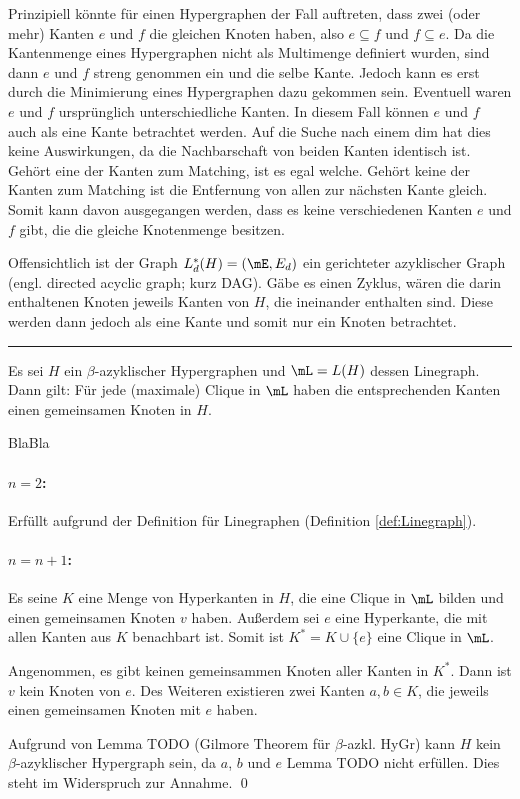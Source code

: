 Prinzipiell könnte für einen Hypergraphen der Fall auftreten, dass zwei (oder mehr) Kanten $e$ und $f$ die gleichen Knoten haben, also $e\subseteq f$ und $f\subseteq e$. Da die Kantenmenge eines Hypergraphen nicht als Multimenge definiert wurden, sind dann $e$ und $f$ streng genommen ein und die selbe Kante. Jedoch kann es erst durch die Minimierung eines Hypergraphen dazu gekommen sein. Eventuell waren $e$ und $f$ ursprünglich unterschiedliche Kanten. In diesem Fall können $e$ und $f$ auch als eine Kante betrachtet werden. Auf die Suche nach einem dim hat dies keine Auswirkungen, da die Nachbarschaft von beiden Kanten identisch ist. Gehört eine der Kanten zum Matching, ist es egal welche. Gehört keine der Kanten zum Matching ist die Entfernung von allen zur nächsten Kante gleich. Somit kann davon ausgegangen werden, dass es keine verschiedenen Kanten $e$ und $f$ gibt, die die gleiche Knotenmenge besitzen.

Offensichtlich ist der Graph $L^*_d(H)=(\mE,E_d)$ ein gerichteter azyklischer Graph 
(engl. directed acyclic graph; kurz DAG). Gäbe es einen Zyklus, wären die darin enthaltenen Knoten jeweils Kanten von $H$, die ineinander enthalten sind. Diese werden dann jedoch als eine Kante und somit nur ein Knoten betrachtet.

\rule{\linewidth}{1pt}
\clearpage

\begin{Theorem}
    Es sei $H$ ein $\beta$-azyklischer Hypergraphen und $\mL=L(H)$ dessen Linegraph. Dann gilt: Für jede (maximale) Clique in $\mL$ haben die entsprechenden Kanten einen gemeinsamen Knoten in $H$.
\end{Theorem}

\begin{Proof}BlaBla
	\paragraph{$n=2$:} Erfüllt aufgrund der Definition für Linegraphen (Definition \ref{def:Linegraph}).
	\paragraph{$n=n+1$:} Es seine $K$ eine Menge von Hyperkanten in $H$, die eine Clique in $\mL$ bilden und einen gemeinsamen Knoten $v$ haben. Außerdem sei $e$ eine Hyperkante, die mit allen Kanten aus $K$ benachbart ist. Somit ist $K^*=K\cup \{e\}$ eine Clique in $\mL$.
	
	Angenommen, es gibt keinen gemeinsammen Knoten aller Kanten in $K^*$. Dann ist $v$ kein Knoten von $e$. Des Weiteren existieren zwei Kanten $a,b \in K$, die jeweils einen gemeinsamen Knoten mit $e$ haben. 
	
	
	Aufgrund von Lemma TODO (Gilmore Theorem für $\beta$-azkl. HyGr) kann $H$ kein $\beta$-azyklischer Hypergraph sein, da $a$, $b$ und $e$ Lemma TODO nicht erfüllen. Dies steht im Widerspruch zur Annahme.
\qed	
\end{Proof}

